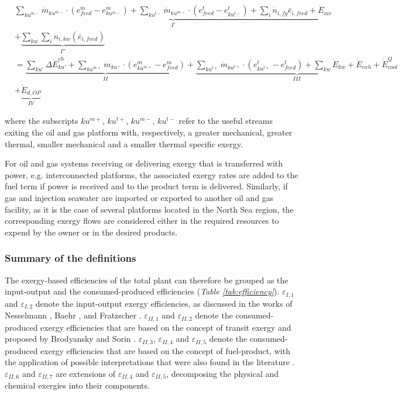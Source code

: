 \documentclass[times,3p]{elsarticle}
\begin{document}
\begin{align}
	&\underbrace{\sum_{ku^{m-}} \dot{m}_{ku^{m-}}\cdot(e_{feed}^{m}-e_{ku^{m-}}^{m})+\sum_{ku^{t-}} \dot{m}_{ku^{m-}}\cdot(e_{feed}^{t}-e_{ku^{t-}}^{t})+\sum_i \dot{n}_{i,fg}\bar{e}_{i,feed}+\dot{E}_{air}}_{I'}\nonumber\\
	&+\underbrace{\sum_{kw}\sum_i \dot{n}_{i,kw}(\bar{e}_{i,feed})}_{I''}\nonumber\\
	&=\underbrace{\sum_{ku'}\Delta{\dot{E}}^{ch}_{ku'}+\sum_{ku^{m+}}\dot{m}_{ku^{+}}\cdot(e_{ku^{m+}}^{m}-e_{feed}^{m})}_{II}+\underbrace{\sum_{ku^{t+}}\dot{m}_{ku^{t+}}\cdot(e_{ku^{t+}}^{t}-e_{feed}^{t})+\sum_{kw} \dot{E}_{kw}+\dot{E}_{exh}+\dot{E}^Q_{cool}}_{III} \nonumber\\
	&+\underbrace{\dot{E}_{d,OP}}_{IV}
	\label{eq:speco_pressure}
\end{align}	

	where the subscripts $ku^{m+}$, $ku^{t+}$, $ku^{m-}$, $ku^{t-}$ refer to the useful streams exiting the oil and gas platform with, respectively, a greater mechanical, greater thermal, smaller mechanical and a smaller thermal specific exergy.

For oil and gas systems receiving or delivering exergy that is transferred with power, e.g. interconnected platforms, the associated exergy rates are added to the fuel term if power is received and to the product term is delivered. Similarly, if gas and injection seawater are imported or exported to another oil and gas facility, as it is the case of several platforms located in the North Sea region, the corresponding exergy flows are considered either in the required resources to expend by the owner or in the desired products.  

\subsubsection{Summary of the definitions}

The exergy-based efficiencies of the total plant can therefore be grouped as the input-output and the consumed-produced efficiencies (\emph{Table \ref{tab:efficiency}}). $\varepsilon_{I,1}$ and $\varepsilon_{I,2}$ denote the input-output exergy efficiencies, as discussed in the works of Nesselmann \cite{Nesselmann1953,Nesselmann1952}, Baehr \cite{Baehr1968}, and Fratzscher \cite{Fratzscher1986}. $\varepsilon_{II,1}$ and $\varepsilon_{II,2}$ denote the consumed-produced exergy efficiencies that are based on the concept of transit exergy and proposed by Brodyansky \cite{Brodyansky1994} and Sorin \cite{Sorin1994}. $\varepsilon_{II,3}$, $\varepsilon_{II,4}$ and $\varepsilon_{II,5}$ denote the consumed-produced exergy efficiencies that are based on the concept of fuel-product, with the application of possible interpretations that were also found in the literature \cite{Kotas1995,Oliveira1997,Voldsund2010,Voldsund2012,Lazzaretto1999,Lazzaretto2006,Cornelissen1997,Rian2012}. $\varepsilon_{II,6}$ and $\varepsilon_{II,7}$ are extensions of $\varepsilon_{II,4}$ and $\varepsilon_{II,5}$, decomposing the physical and chemical exergies into their components.
\end{document}
